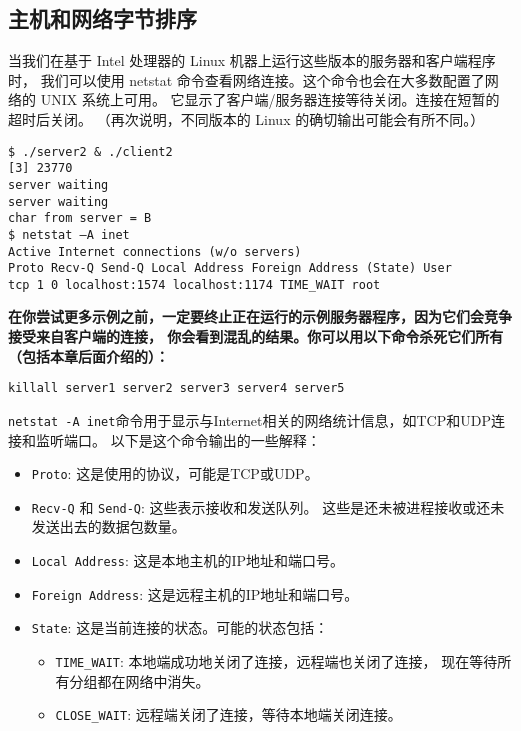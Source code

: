 \documentclass{ctexart}
\begin{document}
\subsection{主机和网络字节排序}  
当我们在基于 Intel 处理器的 Linux 机器上运行这些版本的服务器和客户端程序时，
我们可以使用 netstat 命令查看网络连接。这个命令也会在大多数配置了网络的 UNIX 系统上可用。
它显示了客户端/服务器连接等待关闭。连接在短暂的超时后关闭。
（再次说明，不同版本的 Linux 的确切输出可能会有所不同。）  

\begin{verbatim}  
$ ./server2 & ./client2  
[3] 23770  
server waiting  
server waiting  
char from server = B  
$ netstat –A inet  
Active Internet connections (w/o servers)  
Proto Recv-Q Send-Q Local Address Foreign Address (State) User  
tcp 1 0 localhost:1574 localhost:1174 TIME_WAIT root  
\end{verbatim}  

{\bfseries
在你尝试更多示例之前，一定要终止正在运行的示例服务器程序，因为它们会竞争接受来自客户端的连接，
你会看到混乱的结果。你可以用以下命令杀死它们所有（包括本章后面介绍的）：  
\begin{verbatim}  
killall server1 server2 server3 server4 server5  
\end{verbatim}  
}

\texttt{netstat -A inet}命令用于显示与Internet相关的网络统计信息，如TCP和UDP连接和监听端口。
以下是这个命令输出的一些解释：  
  
\begin{itemize}  
\item \texttt{Proto}: 这是使用的协议，可能是TCP或UDP。  
  
\item \texttt{Recv-Q} 和 \texttt{Send-Q}: 这些表示接收和发送队列。
这些是还未被进程接收或还未发送出去的数据包数量。  
  
\item \texttt{Local Address}: 这是本地主机的IP地址和端口号。  
  
\item \texttt{Foreign Address}: 这是远程主机的IP地址和端口号。  
  
\item \texttt{State}: 这是当前连接的状态。可能的状态包括：  
  \begin{itemize}  
  \item \texttt{TIME\_WAIT}: 本地端成功地关闭了连接，远程端也关闭了连接，
  现在等待所有分组都在网络中消失。  
  \item \texttt{CLOSE\_WAIT}: 远程端关闭了连接，等待本地端关闭连接。  
  \end{itemize}  
\end{itemize}  
  
\end{document}
